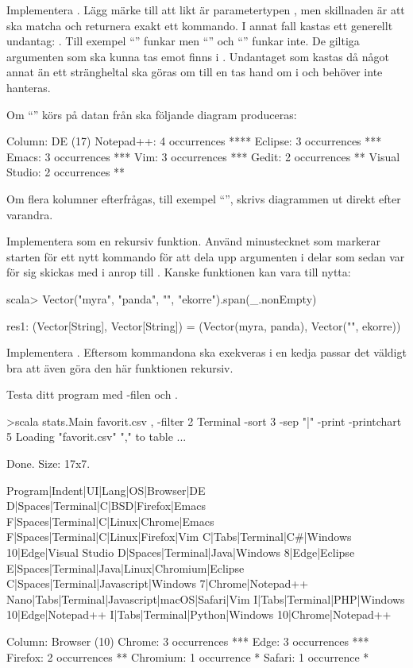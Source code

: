 \Subtask Implementera . Lägg märke till att likt  är parametertypen , men skillnaden är att  ska matcha och returnera exakt ett kommando. I annat fall kastas ett generellt undantag: . Till exempel ``'' funkar men ``'' och ``'' funkar inte. De giltiga argumenten som ska kunna tas emot finns i . Undantaget som kastas då något annat än ett strängheltal ska göras om till en  tas hand om i  och behöver inte hanteras.

Om ``'' körs på datan från  ska följande diagram produceras:
\begin{REPLnonum}
Column: DE (17)
Notepad++: 4 occurrences
****
Eclipse: 3 occurrences
***
Emacs: 3 occurrences
***
Vim: 3 occurrences
***
Gedit: 2 occurrences
**
Visual Studio: 2 occurrences
**

\end{REPLnonum}
Om flera kolumner efterfrågas, till exempel ``'', skrivs diagrammen ut direkt efter varandra.

\Subtask Implementera  som en rekursiv funktion. Använd minustecknet som markerar starten för ett nytt kommando för att dela upp argumenten  i delar som sedan var för sig skickas med i anrop till . Kanske funktionen  kan vara till nytta:
\begin{REPLnonum}
scala> Vector("myra", "panda", "", "ekorre").span(_.nonEmpty)

res1: (Vector[String], Vector[String]) = (Vector(myra, panda),
                                         Vector("", ekorre))
\end{REPLnonum}

\Subtask Implementera . Eftersom kommandona ska exekveras i en kedja passar det väldigt bra att även göra den här funktionen rekursiv.

\Subtask Testa ditt program med -filen och .
\begin{REPLnonum}
>scala stats.Main favorit.csv , -filter 2 Terminal -sort 3 -sep "|" -print
-printchart 5
Loading "favorit.csv" "," to table ...

Done. Size: 17x7.

Program|Indent|UI|Lang|OS|Browser|DE
D|Spaces|Terminal|C|BSD|Firefox|Emacs
F|Spaces|Terminal|C|Linux|Chrome|Emacs
F|Spaces|Terminal|C|Linux|Firefox|Vim
C|Tabs|Terminal|C#|Windows 10|Edge|Visual Studio
D|Spaces|Terminal|Java|Windows 8|Edge|Eclipse
E|Spaces|Terminal|Java|Linux|Chromium|Eclipse
C|Spaces|Terminal|Javascript|Windows 7|Chrome|Notepad++
Nano|Tabs|Terminal|Javascript|macOS|Safari|Vim
I|Tabs|Terminal|PHP|Windows 10|Edge|Notepad++
I|Tabs|Terminal|Python|Windows 10|Chrome|Notepad++

Column: Browser (10)
Chrome: 3 occurrences
***
Edge: 3 occurrences
***
Firefox: 2 occurrences
**
Chromium: 1 occurrence
*
Safari: 1 occurrence
*

\end{REPLnonum}

